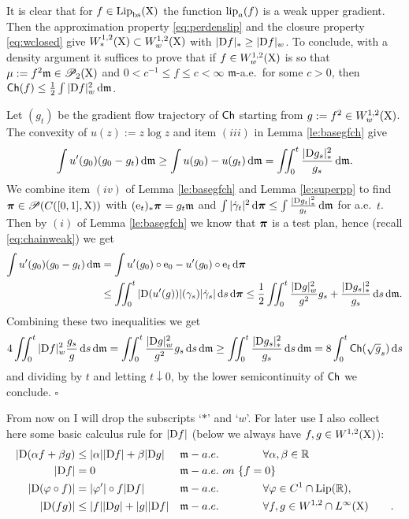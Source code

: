\documentclass[11pt]{article}
\numberwithin{equation}{section}
\newenvironment{idea}{\removelastskip\par\medskip   %
\noindent{\em Idea of the proof} \rm}{\penalty-20\null\hfill$\square$\par\medbreak}
\newcommand{\R}{\mathbb{R}}
\newcommand{\ppi}{{\mbox{\boldmath$\pi$}}}
\newcommand{\pr}{\mathscr P}
\newcommand{\prd}{\mathscr P_2}
\newcommand{\e}{{\rm e}}
\newcommand{\X}{{\rm X}}
\newcommand{\mm}{{\mathfrak m}}
\newcommand{\ch}{{\sf Ch}}
\renewcommand{\d}{{\rm d}}
\newcommand{\D}{{\rm D}}
\newcommand{\Lip}{{\rm Lip}}
\newcommand{\lipa}{{\rm lip}_a}
\newcommand{\bs}{{\rm bs}}
\begin{document}
\begin{idea} It is clear that for $f\in\Lip_\bs(\X)$ the function $\lipa(f)$ is a weak upper gradient. Then the approximation property \eqref{eq:perdenslip} and the closure property \eqref{eq:wclosed}  give $W^{1,2}_*(\X)\subset W^{1,2}_w(\X)$ with $|\D f|_*\geq |\D f|_w$. To conclude, with a density argument it suffices to prove that if  $f\in W^{1,2}_w(\X)$ is so that $\mu:=f^2\mm\in\prd(\X)$ and $0<c^{-1}\leq f\leq c<\infty $ $\mm$-a.e.\ for some $c>0$, then $\ch(f)\leq \tfrac12\int|\D f|^2_w\,\d\mm$. 

Let $(g_t)$ be the gradient flow trajectory of $\ch$ starting from $g:=f^2\in W^{1,2}_w(\X)$. The convexity of $u(z):=z\log z$ and item $(iii)$ in Lemma \ref{le:basegfch} give
\[
\int u'(g_0)(g_0-g_t)\,\d\mm\geq\int u(g_0)-u(g_t)\,\d\mm=\iint_0^t\frac{|\D g_s|_*^2}{g_s}\,\d\mm.
\]
We combine item $(iv)$ of Lemma \ref{le:basegfch}  and  Lemma \ref{le:superpp} to find $\ppi\in\pr(C([0,1],\X))$ with $(\e_t)_*\ppi=g_t\mm$ and $\int|\dot\gamma_t|^2\,\d\ppi\leq\int\frac{|\D g_t|^2_*}{g_t}\,\d\mm$ for a.e.\ $t$. Then by $(i)$ of Lemma \ref{le:basegfch} we know that $\ppi$ is a test plan, hence (recall \eqref{eq:chainweak}) we get
\[
\begin{split}
\int u'(g_0)(g_0-g_t)\,\d\mm&=\int u'(g_0)\circ\e_0-u'(g_0)\circ\e_t\,\d\ppi\\
&\leq \iint_0^t |\D (u'(g))|(\gamma_s)|\dot\gamma_s|\,\d s\,\d\ppi\leq\frac12 \iint_0^t\frac{|\D g|^2_w}{g^2}g_s+\frac{|\D g_s|^2_*}{g_s}\,\d s\,\d\mm.
\end{split}
\]
Combining these  two inequalities we get 
\[
4\iint_0^t{|\D f|^2_w}\frac {g_s}{g}\,\d s\,\d\mm=\iint_0^t\frac{|\D g|^2_w}{g^2}g_s\,\d s\,\d\mm\geq \iint_0^t\frac{|\D g_s|_*^2}{g_s}\,\d s\,\d\mm=8\int_0^t\ch(\sqrt g_s)\,\d s
\]  and dividing by $t$ and letting $t\downarrow0$, by the lower semicontinuity of $\ch$ we conclude.
\end{idea}
From now on I will drop the subscripts `$*$' and `$w$'. For later use I also collect here some basic calculus rule for $|\D f|$ (below we always have $f,g\in W^{1,2}(\X)$):
\begin{subequations}\label{eq:calcdf}
\begin{align}
\label{eq:dfconv}
|\D(\alpha f+\beta g)&\leq |\alpha||\D f|+\beta|\D g|&&\mm-a.e.\qquad\qquad\forall \alpha,\beta\in\R\\
\label{eq:dfloc}
|\D f|&=0&&\mm-a.e.\ on\ \{f=0\}\\
\label{eq:dfchain}
|\D(\varphi\circ f)|&=|\varphi'|\circ f|\D f|&&\mm-a.e.\qquad\qquad \forall   \varphi\in C^1\cap\Lip(\R),\\
\label{eq:dfleib}
|\D(fg)|&\leq |f||\D g|+|g||\D f|&&\mm-a.e.\qquad\qquad\forall f,g\in W^{1,2}\cap L^\infty(\X)\qquad.
\end{align}
\end{subequations}
\end{document}
